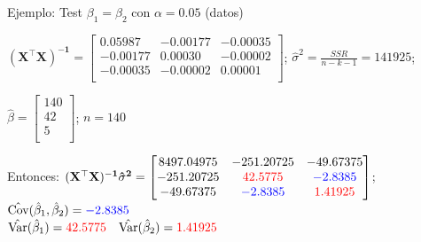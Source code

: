\documentclass{beamer}
\begin{document}
\begin{frame}{Ejemplo: Test $\beta_1 = \beta_2$ con $\alpha = 0.05$ (datos)}

\vspace{0.3cm}

$\mathbf{(X^{\top}X)^{-1}} =
        \begin{bmatrix}
            0.05987 & -0.00177 & -0.00035 \\
            -0.00177 & 0.00030 & -0.00002 \\
            -0.00035 & -0.00002 & 0.00001 \\
        \end{bmatrix}$; $\hat{\sigma}^2 = \frac{SSR}{n-k-1} = 141925$;

        $\hat{\beta} =
        \begin{bmatrix}
            140 \\
            42 \\
            5 \\
        \end{bmatrix}$; $n=140$

Entonces: $\mathbf{(X^{\top}X)^{-1}\hat{\sigma}^2} =
        \begin{bmatrix}
            8497.04975 & -251.20725 & -49.67375 \\
            -251.20725 & \textcolor{red}{42.5775} & \textcolor{blue}{-2.8385} \\
            -49.67375 & \textcolor{blue}{-2.8385} & \textcolor{red}{1.41925} \\
        \end{bmatrix}$; $\hat{\text{Cov}}(\hat{\beta}_1, \hat{\beta}_2) = \textcolor{blue}{-2.8385}$\\
        $\hat{\text{Var}}(\hat{\beta}_1)=\textcolor{red}{42.5775} \quad \hat{\text{Var}}(\hat{\beta}_2)=\textcolor{red}{1.41925} $
\end{frame}
\end{document}
